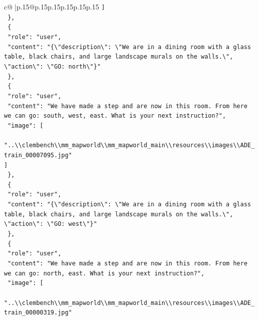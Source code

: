 \documentclass{article}
\begin{document}
{\begin{supertabular}{c@{$\;$}|p{.15\linewidth}@{}p{.15\linewidth}p{.15\linewidth}p{.15\linewidth}p{.15\linewidth}p{.15\linewidth}}
{{{\texttt{    {]}} \\
\texttt{  \},} \\
\texttt{  \{} \\
\texttt{    "role": "user",} \\
\texttt{    "content": "\{\textbackslash{}"description\textbackslash{}": \textbackslash{}"We are in a dining room with a glass table, black chairs, and large landscape murals on the walls.\textbackslash{}", \textbackslash{}"action\textbackslash{}": \textbackslash{}"GO: north\textbackslash{}"\}"} \\
\texttt{  \},} \\
\texttt{  \{} \\
\texttt{    "role": "user",} \\
\texttt{    "content": "We have made a step and are now in this room. From here we can go: south, west, east. What is your next instruction?",} \\
\texttt{    "image": {[}} \\
\texttt{      "..\textbackslash{}\textbackslash{}clembench\textbackslash{}\textbackslash{}mm\_mapworld\textbackslash{}\textbackslash{}mm\_mapworld\_main\textbackslash{}\textbackslash{}resources\textbackslash{}\textbackslash{}images\textbackslash{}\textbackslash{}ADE\_train\_00007095.jpg"} \\
\texttt{    {]}} \\
\texttt{  \},} \\
\texttt{  \{} \\
\texttt{    "role": "user",} \\
\texttt{    "content": "\{\textbackslash{}"description\textbackslash{}": \textbackslash{}"We are in a dining room with a glass table, black chairs, and large landscape murals on the walls.\textbackslash{}", \textbackslash{}"action\textbackslash{}": \textbackslash{}"GO: west\textbackslash{}"\}"} \\
\texttt{  \},} \\
\texttt{  \{} \\
\texttt{    "role": "user",} \\
\texttt{    "content": "We have made a step and are now in this room. From here we can go: north, east. What is your next instruction?",} \\
\texttt{    "image": {[}} \\
\texttt{      "..\textbackslash{}\textbackslash{}clembench\textbackslash{}\textbackslash{}mm\_mapworld\textbackslash{}\textbackslash{}mm\_mapworld\_main\textbackslash{}\textbackslash{}resources\textbackslash{}\textbackslash{}images\textbackslash{}\textbackslash{}ADE\_train\_00000319.jpg"} \\
}}}
\end{supertabular}}
\end{document}
